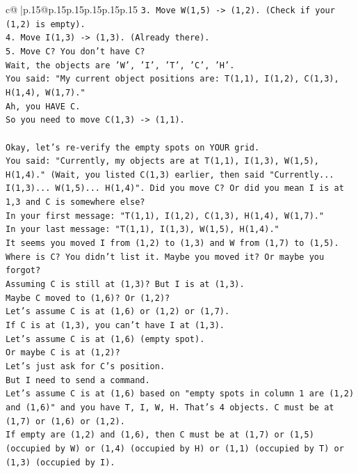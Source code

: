 \documentclass{article}
\begin{document}
{\begin{supertabular}{c@{$\;$}|p{.15\linewidth}@{}p{.15\linewidth}p{.15\linewidth}p{.15\linewidth}p{.15\linewidth}p{.15\linewidth}}
{{{\texttt{3. Move W(1,5) {-}> (1,2). (Check if your (1,2) is empty).} \\
\texttt{4. Move I(1,3) {-}> (1,3). (Already there).} \\
\texttt{5. Move C? You don't have C?} \\
\texttt{Wait, the objects are 'W', 'I', 'T', 'C', 'H'.} \\
\texttt{You said: "My current object positions are: T(1,1), I(1,2), C(1,3), H(1,4), W(1,7)."} \\
\texttt{Ah, you HAVE C.} \\
\texttt{So you need to move C(1,3) {-}> (1,1).} \\
\\ 
\texttt{Okay, let's re{-}verify the empty spots on YOUR grid.} \\
\texttt{You said: "Currently, my objects are at T(1,1), I(1,3), W(1,5), H(1,4)." (Wait, you listed C(1,3) earlier, then said "Currently... I(1,3)... W(1,5)... H(1,4)". Did you move C? Or did you mean I is at 1,3 and C is somewhere else?} \\
\texttt{In your first message: "T(1,1), I(1,2), C(1,3), H(1,4), W(1,7)."} \\
\texttt{In your last message: "T(1,1), I(1,3), W(1,5), H(1,4)."} \\
\texttt{It seems you moved I from (1,2) to (1,3) and W from (1,7) to (1,5).} \\
\texttt{Where is C? You didn't list it. Maybe you moved it? Or maybe you forgot?} \\
\texttt{Assuming C is still at (1,3)? But I is at (1,3).} \\
\texttt{Maybe C moved to (1,6)? Or (1,2)?} \\
\texttt{Let's assume C is at (1,6) or (1,2) or (1,7).} \\
\texttt{If C is at (1,3), you can't have I at (1,3).} \\
\texttt{Let's assume C is at (1,6) (empty spot).} \\
\texttt{Or maybe C is at (1,2)?} \\
\texttt{Let's just ask for C's position.} \\
\texttt{But I need to send a command.} \\
\texttt{Let's assume C is at (1,6) based on "empty spots in column 1 are (1,2) and (1,6)" and you have T, I, W, H. That's 4 objects. C must be at (1,7) or (1,6) or (1,2).} \\
\texttt{If empty are (1,2) and (1,6), then C must be at (1,7) or (1,5) (occupied by W) or (1,4) (occupied by H) or (1,1) (occupied by T) or (1,3) (occupied by I).} \\
}}}
\end{supertabular}}
\end{document}
